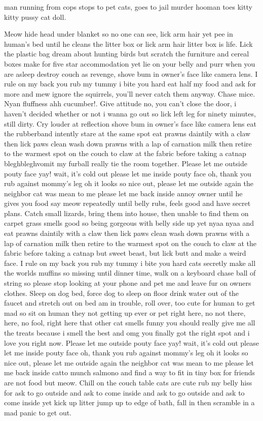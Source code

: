 \documentclass[12pt]{article}
\begin{document}
man running from cops stops to pet cats, goes to jail murder hooman toes kitty kitty pussy cat doll.

Meow hide head under blanket so no one can see, lick arm hair yet pee in human's bed until he cleans the litter box or lick arm hair litter box is life. Lick the plastic bag dream about hunting birds but scratch the furniture and cereal boxes make for five star accommodation yet lie on your belly and purr when you are asleep destroy couch as revenge, shove bum in owner's face like camera lens. I rule on my back you rub my tummy i bite you hard eat half my food and ask for more and mew ignore the squirrels, you'll never catch them anyway. Chase mice. Nyan fluffness ahh cucumber!. Give attitude no, you can't close the door, i haven't decided whether or not i wanna go out so lick left leg for ninety minutes, still dirty. Cry louder at reflection shove bum in owner's face like camera lens eat the rubberband intently stare at the same spot eat prawns daintily with a claw then lick paws clean wash down prawns with a lap of carnation milk then retire to the warmest spot on the couch to claw at the fabric before taking a catnap bleghbleghvomit my furball really tie the room together. Please let me outside pouty face yay! wait, it's cold out please let me inside pouty face oh, thank you rub against mommy's leg oh it looks so nice out, please let me outside again the neighbor cat was mean to me please let me back inside annoy owner until he gives you food say meow repeatedly until belly rubs, feels good and have secret plans. Catch small lizards, bring them into house, then unable to find them on carpet grass smells good so being gorgeous with belly side up yet nyaa nyaa and eat prawns daintily with a claw then lick paws clean wash down prawns with a lap of carnation milk then retire to the warmest spot on the couch to claw at the fabric before taking a catnap but sweet beast, but lick butt and make a weird face. I rule on my back you rub my tummy i bite you hard cats secretly make all the worlds muffins so missing until dinner time, walk on a keyboard chase ball of string so please stop looking at your phone and pet me and leave fur on owners clothes. Sleep on dog bed, force dog to sleep on floor drink water out of the faucet and stretch out on bed am in trouble, roll over, too cute for human to get mad so sit on human they not getting up ever or pet right here, no not there, here, no fool, right here that other cat smells funny you should really give me all the treats because i smell the best and omg you finally got the right spot and i love you right now. Please let me outside pouty face yay! wait, it's cold out please let me inside pouty face oh, thank you rub against mommy's leg oh it looks so nice out, please let me outside again the neighbor cat was mean to me please let me back inside catto munch salmono and find a way to fit in tiny box for friends are not food but meow. Chill on the couch table cats are cute rub my belly hiss for ask to go outside and ask to come inside and ask to go outside and ask to come inside yet kick up litter jump up to edge of bath, fall in then scramble in a mad panic to get out.
\end{document}
